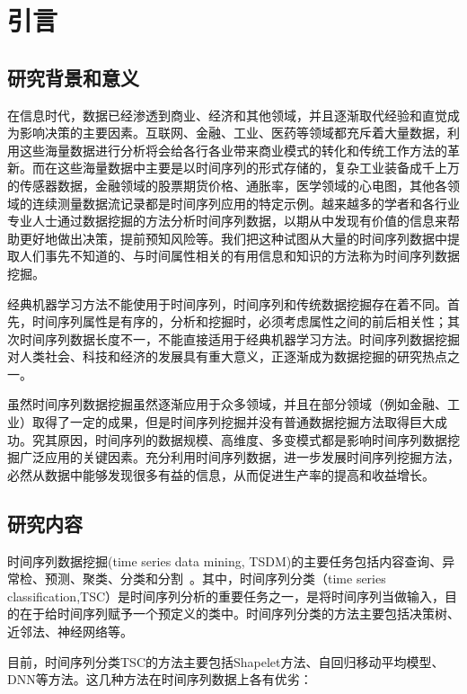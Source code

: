 \chapter{引言}
\label{cha:intro}

\section{研究背景和意义}

在信息时代，数据已经渗透到商业、经济和其他领域，并且逐渐取代经验和直觉成为影响决策的主要因素。互联网、金融、工业、医药等领域都充斥着大量数据，利用这些海量数据进行分析将会给各行各业带来商业模式的转化和传统工作方法的革新。而在这些海量数据中主要是以时间序列的形式存储的，复杂工业装备成千上万的传感器数据，金融领域的股票期货价格、通胀率，医学领域的心电图，其他各领域的连续测量数据流记录都是时间序列应用的特定示例。越来越多的学者和各行业专业人士通过数据挖掘的方法分析时间序列数据，以期从中发现有价值的信息来帮助更好地做出决策，提前预知风险等。我们把这种试图从大量的时间序列数据中提取人们事先不知道的、与时间属性相关的有用信息和知识的方法称为时间序列数据挖掘。

经典机器学习方法不能使用于时间序列，时间序列和传统数据挖掘存在着不同。首先，时间序列属性是有序的，分析和挖掘时，必须考虑属性之间的前后相关性；其次时间序列数据长度不一，不能直接适用于经典机器学习方法。时间序列数据挖掘对人类社会、科技和经济的发展具有重大意义，正逐渐成为数据挖掘的研究热点之一。

虽然时间序列数据挖掘虽然逐渐应用于众多领域，并且在部分领域（例如金融、工业）取得了一定的成果，但是时间序列挖掘并没有普通数据挖掘方法取得巨大成功。究其原因，时间序列的数据规模、高维度、多变模式都是影响时间序列数据挖掘广泛应用的关键因素。充分利用时间序列数据，进一步发展时间序列挖掘方法，必然从数据中能够发现很多有益的信息，从而促进生产率的提高和收益增长。


\section{研究内容}

时间序列数据挖掘(time series data mining, TSDM)的主要任务包括内容查询、异常检、预测、聚类、分类和分割~\cite{esling2012time}。其中，时间序列分类（time series classification,TSC）是时间序列分析的重要任务之一，是将时间序列当做输入，目的在于给时间序列赋予一个预定义的类中。时间序列分类的方法主要包括决策树、近邻法、神经网络等。

目前，时间序列分类TSC的方法主要包括Shapelet方法、自回归移动平均模型、DNN等方法。这几种方法在时间序列数据上各有优劣：

